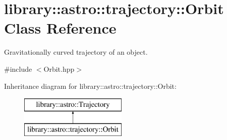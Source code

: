 \hypertarget{classlibrary_1_1astro_1_1trajectory_1_1_orbit}{}\section{library\+:\+:astro\+:\+:trajectory\+:\+:Orbit Class Reference}
\label{classlibrary_1_1astro_1_1trajectory_1_1_orbit}


Gravitationally curved trajectory of an object.  




{\ttfamily \#include $<$Orbit.\+hpp$>$}

Inheritance diagram for library\+:\+:astro\+:\+:trajectory\+:\+:Orbit\+:\begin{figure}[H]
\begin{center}
\leavevmode
\includegraphics[height=2.000000cm]{classlibrary_1_1astro_1_1trajectory_1_1_orbit}
\end{center}
\end{figure}
